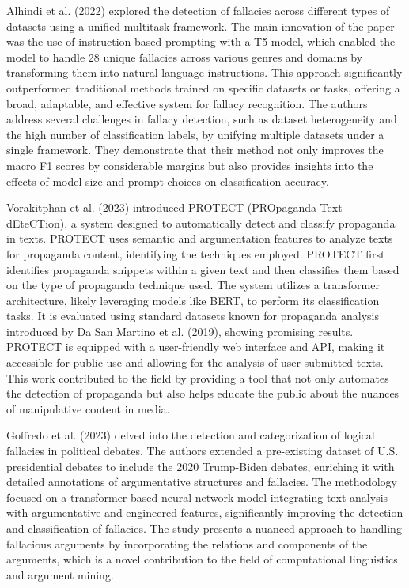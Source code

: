  Alhindi et al. (2022) \cite{alhindiMultitaskInstructionbasedPrompting2022} explored the detection of fallacies across different types of datasets using a unified multitask framework. The main innovation of the paper was the use of instruction-based prompting with a T5 model, which enabled the model to handle 28 unique fallacies across various genres and domains by transforming them into natural language instructions. This approach significantly outperformed traditional methods trained on specific datasets or tasks, offering a broad, adaptable, and effective system for fallacy recognition.
The authors address several challenges in fallacy detection, such as dataset heterogeneity and the high number of classification labels, by unifying multiple datasets under a single framework. They demonstrate that their method not only improves the macro F1 scores by considerable margins but also provides insights into the effects of model size and prompt choices on classification accuracy. 

Vorakitphan et al. (2023) \cite{vorakitphanPROTECTPipelinePropaganda2022}  introduced PROTECT (PROpaganda Text dEteCTion), a system designed to automatically detect and classify propaganda in texts. PROTECT uses semantic and argumentation features to analyze texts for propaganda content, identifying the techniques employed.
PROTECT first identifies propaganda snippets within a given text and then classifies them based on the type of propaganda technique used. The system utilizes a transformer architecture, likely leveraging models like BERT, to perform its classification tasks.
It is evaluated using standard datasets known for propaganda analysis introduced by Da San Martino et al. (2019)\cite{dasanmartinoFineGrainedAnalysisPropaganda2019}, showing promising results.
PROTECT is equipped with a user-friendly web interface and API, making it accessible for public use and allowing for the analysis of user-submitted texts.
This work contributed to the field by providing a tool that not only automates the detection of propaganda but also helps educate the public about the nuances of manipulative content in media.

Goffredo et al. (2023) \cite{goffredoArgumentbasedDetectionClassification2023} delved into the detection and categorization of logical fallacies in political debates. The authors extended a pre-existing dataset of U.S. presidential debates to include the 2020 Trump-Biden debates, enriching it with detailed annotations of argumentative structures and fallacies.
The methodology focused on a transformer-based neural network model integrating text analysis with argumentative and engineered features, significantly improving the detection and classification of fallacies. 
The study presents a nuanced approach to handling fallacious arguments by incorporating the relations and components of the arguments, which is a novel contribution to the field of computational linguistics and argument mining.

